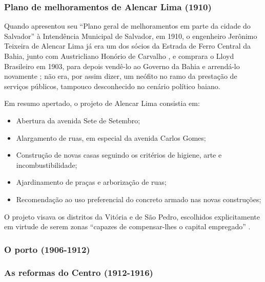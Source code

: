 \subsubsection{Plano de melhoramentos de Alencar Lima (1910)}\label{subsubsec:1.4.3.2}

Quando apresentou seu ``Plano geral de melhoramentos em parte da cidade do Salvador'' à Intendência Municipal de Salvador, em 1910, o engenheiro Jerônimo Teixeira de Alencar Lima já era um dos sócios da Estrada de Ferro Central da Bahia, junto com Austricliano Honório de Carvalho \cite{souza_trabalholivre_2011}, e comprara o Lloyd Brasileiro em 1903, para depois vendê-lo ao Governo da Bahia e arrendá-lo novamente \cite[p.~220]{CUNHA2011}; não era, por assim dizer, um neófito no ramo da prestação de serviços públicos, tampouco desconhecido no cenário político baiano.

Em resumo apertado, o projeto de Alencar Lima consistia em:

\begin{itemize}
\item Abertura da avenida Sete de Setembro;
\item Alargamento de ruas, em especial da avenida Carlos Gomes;
\item Construção de novas casas seguindo os critérios de higiene, arte e incombustibilidade;
\item Ajardinamento de praças e arborização de ruas;
\item Recomendação ao uso preferencial do concreto armado nas novas construções;
\end{itemize}

O projeto visava os distritos da Vitória e de São Pedro, escolhidos explicitamente em virtude de serem zonas ``capazes de compensar-lhes o capital empregado'' \cite[p.~95]{CUNHA2011}. 

\subsubsection{O porto (1906-1912)}\label{subsubsec:1.4.3.3}



\subsubsection{As reformas do Centro (1912-1916)}\label{subsubsec:1.4.3.4}

